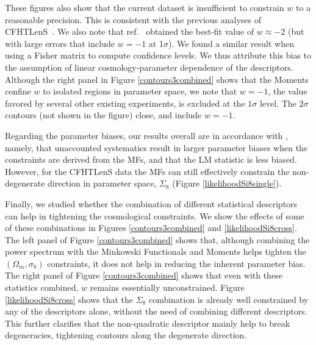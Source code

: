 \documentclass[reprint,aps,prd,superscriptaddress,showkeys,showpacs]{revtex4-1}
\begin{document}
These figures also show that the current dataset is insufficient to
constrain $w$ to a reasonable precision.
This is consistent with the previous analyses of
CFHTLenS~\citep{CFHTKilbinger,CFHTFu,Companion,CFHTMasato}.  We also
note that ref.~\citep{CFHTMasato} obtained the best-fit value of
$w\approx -2$ (but with large errors that include $w=-1$ at
1$\sigma$).  We found a similar result when using a Fisher matrix to
compute confidence levels.  We thus attribute this bias to the
assumption of linear cosmology-parameter dependence of the
descriptors.  
%
Although the right panel in Figure
\ref{contours3combined} shows that the Moments confine $w$ to isolated
regions in parameter space, we note that $w=-1$, the value favored by
several other existing experiments, is excluded at the $1\sigma$
level. The $2\sigma$ contours (not shown in the figure) close, and
include $w=-1$.


Regarding the parameter biases, our results overall are in accordance
with \citep{PetriSpurious}, namely, that unaccounted systematics
result in larger parameter biases when the constraints are derived
from the MFs, and that the LM statistic is less biased. However, for
the CFHTLenS data the MFs can still effectively constrain the
non-degenerate direction in parameter space, $\Sigma_8$ (Figure
\ref{likelihoodSi8single}).



Finally, we studied whether the combination of different statistical
descriptors can help in tightening the cosmological constraints. We
show the effects of some of these combinations in Figures
\ref{contours3combined} and \ref{likelihoodSi8cross}. The left panel
of Figure \ref{contours3combined} shows that, although combining the
power spectrum with the Minkowski Functionals and Moments helps
tighten the $(\Omega_m,\sigma_8)$ constraints, it does not help in
reducing the inherent parameter bias. The right panel of Figure
\ref{contours3combined} shows that even with these statistics
combined, $w$ remains essentially unconstrained. Figure
\ref{likelihoodSi8cross} shows that the $\Sigma_8$ combination is
already well constrained by any of the descriptors alone, without the
need of combining different descriptors.
This further clarifies that the non-quadratic descriptor mainly help
to break degeneracies, tightening contours along the
degenerate direction.
\end{document}
